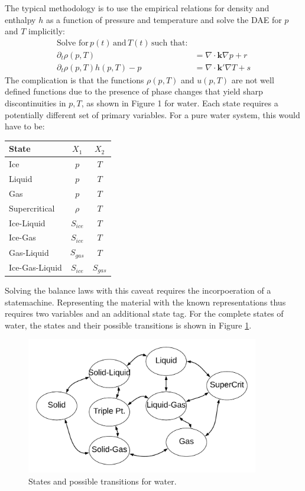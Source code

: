 \documentclass[AMA,STIX1COL]{WileyNJD-v2}
\begin{document}
The typical methodology is to use the empirical relations for density
and enthalpy \(h\) as a function of pressure and temperature and solve
the DAE for \(p\) and \(T\) implicitly:
\begin{align}
\text{Solve for}\, p(t)\, \text{and}\, T(t)\, \text{such that:}\\
\partial_t \rho(p,T) & = \nabla \cdot \mathbf{k}\nabla p + r\\
\partial_t \rho(p,T) h(p,T)-p & = \nabla \cdot \mathbf{k'}\nabla T + s
\end{align}
The complication is that the functions \(\rho(p,T)\) and \(u(p,T)\)
are not well defined functions due to the presence of phase changes that
yield sharp discontinuities in \(p,T\), as shown in Figure 1 for
water.
Each state requires a potentially different set of primary
variables. For a pure water system, this would have to be:
\begin{center}
\begin{tabular}{l|c|c}
  State & $X_1$ & $X_2$ \\
  \hline
  Ice & $p$ & $T$ \\
  Liquid & $p$ & $T$ \\
  Gas & $p$ & $T$ \\
  Supercritical & $\rho$ & $T$ \\
  Ice-Liquid & $S_{ice}$ & $T$ \\
  Ice-Gas & $S_{ice}$ & $T$ \\
  Gas-Liquid & $S_{gas}$ & $T$ \\
  Ice-Gas-Liquid & $S_{ice}$ & $S_{gas}$ 
\end{tabular}
\end{center}
Solving the balance laws with this caveat requires the incorpoeration
of a statemachine. Representing the material with the known
representations thus requires two variables and an additional state
tag. For the complete states of water, the states and their possible
transitions is shown in Figure \ref{fig:statemachine}.
  \begin{figure}
    \centering
    \includegraphics[width=4in]{../slides/phase_4.png}
    \caption{\label{fig:statemachine}States and possible transitions for water.}
\end{figure}
\end{document}
